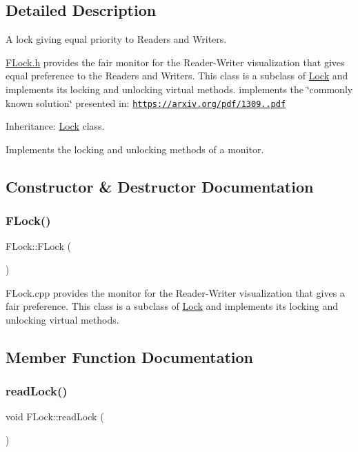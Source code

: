 \subsection{Detailed Description}
A lock giving equal priority to Readers and Writers. 

\hyperlink{_f_lock_8h_source}{F\+Lock.\+h} provides the fair monitor for the Reader-\/\+Writer visualization that gives equal preference to the Readers and Writers. This class is a subclass of \hyperlink{class_lock}{Lock} and implements its locking and unlocking virtual methods. implements the \char`\"{}commonly known solution\char`\"{} presented in\+: \href{https://arxiv.org/pdf/1309.4507.pdf}{\tt https\+://arxiv.\+org/pdf/1309..\+pdf}

Inheritance\+: \hyperlink{class_lock}{Lock} class.

Implements the locking and unlocking methods of a monitor. 

\subsection{Constructor \& Destructor Documentation}
\mbox{\label{class_f_lock_a7fbb4dfce8ff879b88ff77efd4b76a96}} 
\subsubsection{\texorpdfstring{F\+Lock()}{FLock()}}
{\footnotesize\ttfamily F\+Lock\+::\+F\+Lock (\begin{DoxyParamCaption}{ }\end{DoxyParamCaption})}

F\+Lock.\+cpp provides the monitor for the Reader-\/\+Writer visualization that gives a fair preference. This class is a subclass of \hyperlink{class_lock}{Lock} and implements its locking and unlocking virtual methods. 

\subsection{Member Function Documentation}
\mbox{\label{class_f_lock_a8b1cde1cfe107eeb20d5f250a1c310e6}} 
\subsubsection{\texorpdfstring{read\+Lock()}{readLock()}}
{\footnotesize\ttfamily void F\+Lock\+::read\+Lock (\begin{DoxyParamCaption}{ }\end{DoxyParamCaption})\hspace{0.3cm}{\ttfamily [virtual]}}



